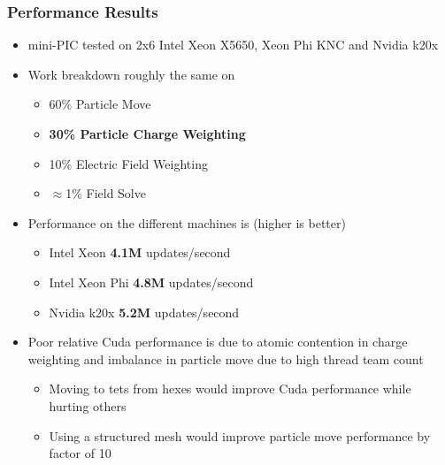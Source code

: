 \documentclass[t]{beamer}
\begin{document}
\begin{frame}
 
 \frametitle{Performance Results}

 \begin{itemize}
   \item {mini-PIC tested on 2x6 Intel Xeon X5650, Xeon Phi KNC and Nvidia k20x}
     \item {Work breakdown roughly the same on }
 \begin{itemize}
   \item {60\% Particle Move}
   \item {\bf{30\% Particle Charge Weighting}}
   \item {10\% Electric Field Weighting}
   \item {$\approx$1\% Field Solve}
 \end{itemize}
 \item {Performance on the different machines is (higher is better) }
   \begin{itemize}
   \item {Intel Xeon {\bf{4.1M}} updates/second}
   \item {Intel Xeon Phi {\bf{4.8M}} updates/second}
   \item {Nvidia k20x {\bf{5.2M}} updates/second}
 \end{itemize}
 \item {Poor relative Cuda performance is due to atomic contention in charge
   weighting and imbalance in particle move due to high thread team
   count}
   \begin{itemize}
     \item Moving to tets from hexes would improve Cuda performance
       while hurting others
     \item Using a structured mesh would improve particle move performance by factor
       of 10
 \end{itemize}


 \end{itemize}


\end{frame}

\end{document}
